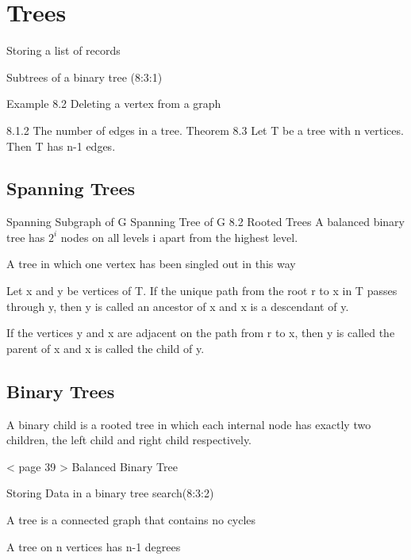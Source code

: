 
\section{Trees}

Storing a list of records

Subtrees of a binary tree (8:3:1)


Example 8.2 Deleting a vertex from a graph

8.1.2 The number of edges in a tree.
Theorem 8.3 Let T be a tree with n vertices. Then T has n-1 edges.
\subsection*{Spanning Trees}
Spanning Subgraph of G
Spanning Tree of G
8.2 Rooted Trees
A balanced binary tree has $2^i$ nodes on all levels i apart from the highest level.

A tree in which one vertex has been singled out in this way

Let x and y be vertices of T. If the unique path from the root r
to x in T passes through y, then y is called an ancestor of x and x is a 
descendant of y.

If the vertices y and x are adjacent on the path from r to x, then
y is called the parent of x and x is called the child of y.


\subsection{Binary Trees}
A binary child is a rooted tree in which each internal node has exactly
two children, the left child and right child respectively.

< page 39 >
Balanced Binary Tree

Storing Data in a binary tree search(8:3:2)

A tree is a connected graph that contains no cycles

A tree on n vertices has n-1 degrees



 



